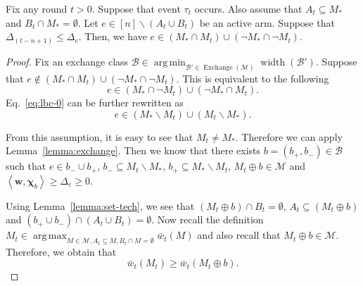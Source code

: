 \documentclass{article}
\newcommand{\M}{\mathcal M}
\newcommand{\B}{\mathcal B}
\newcommand{\del}{\backslash}
\DeclareMathOperator{\rank}{width}
\DeclareMathOperator*{\argmax}{arg\,max}
\DeclareMathOperator*{\argmin}{arg\,min}
\DeclareMathOperator{\Exchange}{Exchange}
\newcommand{\inn}[1]{\left\langle #1 \right\rangle}
\renewcommand{\vec}[1]{\boldsymbol{#1}}
\begin{document}
\begin{lemma}
Fix any round $t>0$. 
Suppose that event $\tau_t$ occurs. 
Also assume that $A_t \subseteq M_*$ and $B_t \cap M_* = \emptyset$.
Let $e\in [n] \del (A_t \cup B_t)$ be an active arm.
Suppose that $\Delta_{(t-n+1)} \le \Delta_e$.
Then, we have $e\in (M_* \cap M_t) \cup ( \neg M_* \cap \neg M_t)$.
\label{lemma:budget:correct}
\end{lemma}

\begin{proof}

Fix an exchange class $\B\in \argmin_{\B'\in \Exchange(\M)} \rank(\B')$.
Suppose that $e\not\in (M_* \cap M_t) \cup ( \neg M_* \cap \neg M_t)$. 
This is equivalent to the following 
\begin{equation}
\label{eq:lbc-0}
e\in (M_* \cap \neg M_t) \cup (\neg M_* \cap M_t).
\end{equation}
Eq.~\eqref{eq:lbc-0} can be further rewritten as 
$$
e\in (M_* \del M_t) \cup (M_t \del M_*).
$$

From this assumption, it is easy to see that $M_t \not= M_*$.
Therefore we can apply Lemma~\ref{lemma:exchange}.
Then we know that there exists $b=(b_+,b_-)\in \B$ such that 
$e\in b_- \cup b_+$, $b_-\subseteq M_t \del M_*$, $b_+\subseteq M_* \del M_t$, $M_t\oplus b \in \M$ and $\inn{\vec w, \vec \chi_b} \ge \Delta_e \ge 0$.

Using Lemma~\ref{lemma:set-tech}, we see that
$(M_t \oplus b) \cap B_t = \emptyset$, $A_t \subseteq (M_t \oplus b)$ and $(b_+\cup b_-) \cap (A_t \cup B_t) = \emptyset$.
Now recall the definition $M_t \in \argmax_{M\in \M, A_t\subseteq M, B_t \cap M = \emptyset} \bar w_t(M)$ and also recall that $M_t \oplus b \in \M$.
Therefore, we obtain that 
\begin{equation}
\label{eq:lbc-1}
\bar w_t(M_t) \ge \bar w_t(M_t \oplus b).
\end{equation}


\end{proof}
\end{document}
